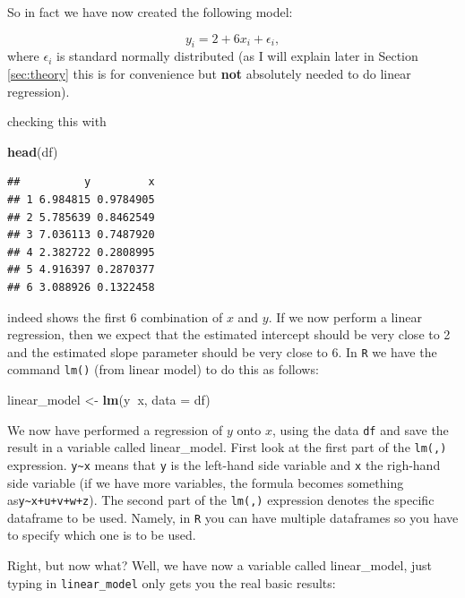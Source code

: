 \documentclass[]{article}
\newenvironment{Shaded}{\begin{snugshade}}{\end{snugshade}}
\newcommand{\KeywordTok}[1]{\textcolor[rgb]{0.13,0.29,0.53}{\textbf{#1}}}
\newcommand{\DataTypeTok}[1]{\textcolor[rgb]{0.13,0.29,0.53}{#1}}
\newcommand{\StringTok}[1]{\textcolor[rgb]{0.31,0.60,0.02}{#1}}
\newcommand{\OperatorTok}[1]{\textcolor[rgb]{0.81,0.36,0.00}{\textbf{#1}}}
\newcommand{\NormalTok}[1]{#1}
\theoremstyle{definition}
\theoremstyle{definition}
\theoremstyle{definition}
\theoremstyle{remark}
\begin{document}
So in fact we have now created the following model:

\[
y_i = 2 + 6 x_i + \epsilon_i,
\] where \(\epsilon_i\) is standard normally distributed (as I will
explain later in Section \ref{sec:theory} this is for convenience but
\textbf{not} absolutely needed to do linear regression).

checking this with

\begin{Shaded}
\begin{Highlighting}[]
\KeywordTok{head}\NormalTok{(df)}
\end{Highlighting}
\end{Shaded}

\begin{verbatim}
##          y         x
## 1 6.984815 0.9784905
## 2 5.785639 0.8462549
## 3 7.036113 0.7487920
## 4 2.382722 0.2808995
## 5 4.916397 0.2870377
## 6 3.088926 0.1322458
\end{verbatim}

indeed shows the first 6 combination of \(x\) and \(y\). If we now
perform a linear regression, then we expect that the estimated intercept
should be very close to 2 and the estimated slope parameter should be
very close to 6. In \texttt{R} we have the command \texttt{lm()} (from
linear model) to do this as follows:

\begin{Shaded}
\begin{Highlighting}[]
\NormalTok{linear_model <-}\StringTok{ }\KeywordTok{lm}\NormalTok{(y}\OperatorTok{~}\NormalTok{x, }\DataTypeTok{data =}\NormalTok{ df)}
\end{Highlighting}
\end{Shaded}

We now have performed a regression of \(y\) onto \(x\), using the data
\texttt{df} and save the result in a variable called linear\_model.
First look at the first part of the \texttt{lm(,)} expression.
\texttt{y\textasciitilde{}x} means that \texttt{y} is the left-hand side
variable and \texttt{x} the righ-hand side variable (if we have more
variables, the formula becomes something
as\texttt{y\textasciitilde{}x+u+v+w+z}). The second part of the
\texttt{lm(,)} expression denotes the specific dataframe to be used.
Namely, in \texttt{R} you can have multiple dataframes so you have to
specify which one is to be used.

Right, but now what? Well, we have now a variable called linear\_model,
just typing in \texttt{linear\_model} only gets you the real basic
results:
\end{document}
